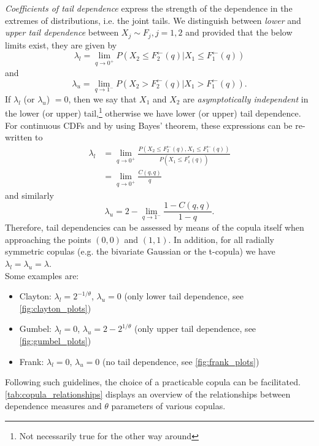 
\textit{Coefficients of tail dependence} express the strength of the dependence in the extremes of distributions, i.e. the joint tails. We distinguish between \textit{lower} and \textit{upper tail dependence} between $X_j \sim F_j, j = 1,2$ and provided that the below limits exist, they are given by
\begin{equation}
\lambda_{l}=\lim \limits _ {q \rightarrow 0^+} P \left(X_{2} \leq F_{2}^{\leftarrow}(q) | X_{1} \leq F_{1}^{\leftarrow}(q)\right) 
\label{eq:lower_tail_dependence}
\end{equation}
and 
\begin{equation}
\lambda_{u}=\lim \limits _ {q \rightarrow 1^-} P \left(X_{2} > F_{2}^{\leftarrow}(q) | X_{1} > F_{1}^{\leftarrow}(q)\right).
\label{eq:upper_tail_dependence}
\end{equation}
If $\lambda_l$ (or $\lambda_u$) $=0$, then we say that $X_1$ and $X_2$ are \textit{asymptotically independent} in the lower (or upper) tail,\footnote{Not necessarily true for the other way around} otherwise we have lower (or upper) tail dependence.\\
For continuous \acp{CDF} and by using Bayes' theorem, these expressions can be re-written to
$$
\begin{aligned}
\lambda_{l} &=\lim _{q \rightarrow 0^+} \frac{P\left(X_{2} \leq F_{2}^{\leftarrow}(q), X_{1} \leq F_{1}^{\leftarrow}(q)\right)}{P\left(X_{1} \leq F_{1}^{*}(q)\right)} \\
&=\lim _{q \rightarrow 0^+} \frac{C(q, q)}{q}
\end{aligned}
$$
and similarly
$$
\lambda_u = 2-\lim _{q \rightarrow 1^-} \frac{1-C(q, q)}{1-q}.
$$
Therefore, tail dependencies can be assessed by means of the copula itself when approaching the points $(0,0)$ and $(1,1)$. In addition, for all radially symmetric copulas (e.g. the bivariate Gaussian or the t-copula) we have $\lambda_l = \lambda_u = \lambda$.\\
Some examples are:
\begin{itemize}
\item Clayton: $\lambda_l = 2^{-1/ \theta}$, $\lambda_u = 0$ (only lower tail dependence, see \autoref{fig:clayton_plots})
\item Gumbel: $\lambda_l = 0$, $\lambda_u = 2 - 2^{1/ \theta}$ (only upper tail dependence, see \autoref{fig:gumbel_plots})
\item Frank: $\lambda_l = 0$, $\lambda_u = 0$ (no tail dependence, see \autoref{fig:frank_plots})
\end{itemize}
Following such guidelines, the choice of a practicable copula can be facilitated. \autoref{tab:copula_relationships} displays an overview of the relationships between dependence measures and $\theta$ parameters of various copulas.\\



